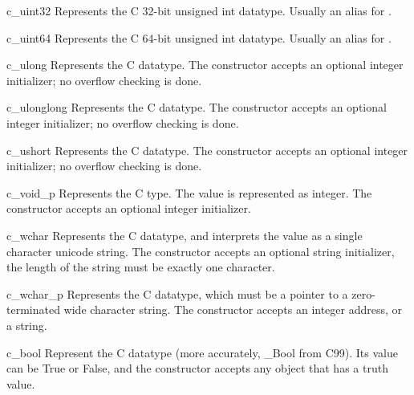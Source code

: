 \begin{classdesc*}{c_uint32}
Represents the C 32-bit unsigned int datatype. Usually an alias for
.
\end{classdesc*}

\begin{classdesc*}{c_uint64}
Represents the C 64-bit unsigned int datatype. Usually an alias for
.
\end{classdesc*}

\begin{classdesc*}{c_ulong}
Represents the C  datatype. The constructor accepts an
optional integer initializer; no overflow checking is done.
\end{classdesc*}

\begin{classdesc*}{c_ulonglong}
Represents the C  datatype. The constructor
accepts an optional integer initializer; no overflow checking is
done.
\end{classdesc*}

\begin{classdesc*}{c_ushort}
Represents the C  datatype. The constructor accepts an
optional integer initializer; no overflow checking is done.
\end{classdesc*}

\begin{classdesc*}{c_void_p}
Represents the C  type. The value is represented as
integer. The constructor accepts an optional integer initializer.
\end{classdesc*}

\begin{classdesc*}{c_wchar}
Represents the C  datatype, and interprets the value as a
single character unicode string. The constructor accepts an
optional string initializer, the length of the string must be
exactly one character.
\end{classdesc*}

\begin{classdesc*}{c_wchar_p}
Represents the C  datatype, which must be a pointer to
a zero-terminated wide character string. The constructor accepts
an integer address, or a string.
\end{classdesc*}

\begin{classdesc*}{c_bool}
Represent the C  datatype (more accurately, _Bool from C99).
Its value can be True or False, and the constructor accepts any object that
has a truth value.
\end{classdesc*}


